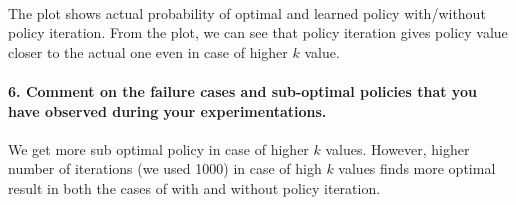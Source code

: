 \documentclass[11pt]{article}
\begin{document}
    \begin{center}
    \end{center}
    { \hspace*{\fill} \\}
    
    The plot shows actual probability of optimal and learned policy
with/without policy iteration. From the plot, we can see that policy
iteration gives policy value closer to the actual one even in case of
higher \(k\) value.

    \paragraph{6. Comment on the failure cases and sub-optimal policies that
you have observed during your
experimentations.}\label{comment-on-the-failure-cases-and-sub-optimal-policies-that-you-have-observed-during-your-experimentations.}

    We get more sub optimal policy in case of higher \(k\) values. However,
higher number of iterations (we used 1000) in case of high \(k\) values
finds more optimal result in both the cases of with and without policy
iteration.


    
    
    
    
\end{document}

